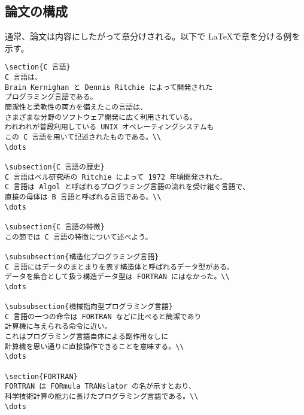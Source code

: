 \subsection{論文の構成}
\label{sec:latex:section}

通常、論文は内容にしたがって章分けされる。以下で \LaTeX で章を分ける例を示す。
\begin{reidai}
\begin{verbatim}
\section{C 言語}
C 言語は、
Brain Kernighan と Dennis Ritchie によって開発された
プログラミング言語である。
簡潔性と柔軟性の両方を備えたこの言語は、
さまざまな分野のソフトウェア開発に広く利用されている。
われわれが普段利用している UNIX オペレーティングシステムも
この C 言語を用いて記述されたものである。\\
\dots

\subsection{C 言語の歴史}
C 言語はベル研究所の Ritchie によって 1972 年頃開発された。
C 言語は Algol と呼ばれるプログラミング言語の流れを受け継ぐ言語で、
直接の母体は B 言語と呼ばれる言語である。\\
\dots

\subsection{C 言語の特徴}
この節では C 言語の特徴について述べよう。

\subsubsection{構造化プログラミング言語}
C 言語にはデータのまとまりを表す構造体と呼ばれるデータ型がある。
データを集合として扱う構造データ型は FORTRAN にはなかった。\\
\dots

\subsubsection{機械指向型プログラミング言語}
C 言語の一つの命令は FORTRAN などに比べると簡潔であり
計算機に与えられる命令に近い。
これはプログラミング言語自体による副作用なしに
計算機を思い通りに直接操作できることを意味する。\\
\dots

\section{FORTRAN}
FORTRAN は FORmula TRANslator の名が示すとおり、
科学技術計算の能力に長けたプログラミング言語である。\\
\dots
\end{verbatim}
\end{reidai} \noindent
